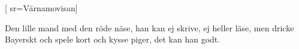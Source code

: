 
[
  sr={Värnamovisan}]
  
\beginverse*
 Den lille mand med den röde näse,
han kan ej skrive, ej heller läse,
men dricke Bayerskt och spele kort
och kysse piger, det kan han godt.
\endverse
\endsong